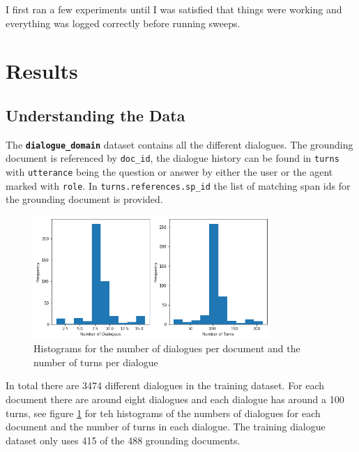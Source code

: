 \documentclass[11pt]{article}
\begin{document}
    I first ran a few experiments until I was satisfied that things were working and everything was logged correctly before
    running sweeps.


    \section{Results}\label{sec:results}

    \subsection{Understanding the Data}\label{subsec:understanding-the-data-results}

    The \textbf{\texttt{dialogue\_domain}} dataset contains all the different dialogues. The grounding document is referenced
    by \texttt{doc\_id}, the dialogue history can be found in \texttt{turns} with \texttt{utterance} being the question
    or answer by either the user or the agent marked with \texttt{role}. In \texttt{turns.references.sp\_id} the list of
    matching span ids for the grounding document is provided.

    \begin{figure}[h]
        \centering
        \includegraphics[width=0.8\textwidth]{number_of_dialogues_and_turns}
        \caption{Histograms for the number of dialogues per document and the number of turns per dialogue}
        \label{fig:histogram-dialogue-and-turns}
    \end{figure}

    In total there are 3474 different dialogues in the training dataset. For each document there are around eight dialogues and
    each dialogue has around a 100 turns, see figure \ref{fig:histogram-dialogue-and-turns} for teh histograms of the numbers of
    dialogues for each document and the number of turns in each dialogue.
    The training dialogue dataset only uses 415 of the 488 grounding documents.\\
\end{document}
